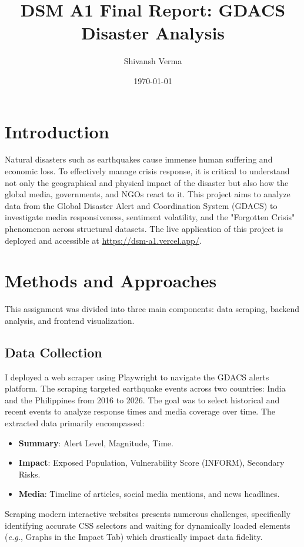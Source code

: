 \documentclass[11pt,a4paper]{article}
\title{\textbf{DSM A1 Final Report: GDACS Disaster Analysis}}
\author{Shivansh Verma}
\date{\today}
\begin{document}
\maketitle

\tableofcontents
\newpage

\section{Introduction}
Natural disasters such as earthquakes cause immense human suffering and economic loss. To effectively manage crisis response, it is critical to understand not only the geographical and physical impact of the disaster but also how the global media, governments, and NGOs react to it. This project aims to analyze data from the Global Disaster Alert and Coordination System (GDACS) to investigate media responsiveness, sentiment volatility, and the "Forgotten Crisis" phenomenon across structural datasets. The live application of this project is deployed and accessible at \url{https://dsm-a1.vercel.app/}.

\section{Methods and Approaches}
This assignment was divided into three main components: data scraping, backend analysis, and frontend visualization. 

\subsection{Data Collection}
I deployed a web scraper using Playwright to navigate the GDACS alerts platform. The scraping targeted earthquake events across two countries: India and the Philippines from 2016 to 2026. The goal was to select historical and recent events to analyze response times and media coverage over time. The extracted data primarily encompassed:
\begin{itemize}
    \item \textbf{Summary}: Alert Level, Magnitude, Time.
    \item \textbf{Impact}: Exposed Population, Vulnerability Score (INFORM), Secondary Risks.
    \item \textbf{Media}: Timeline of articles, social media mentions, and news headlines.
\end{itemize}
Scraping modern interactive websites presents numerous challenges, specifically identifying accurate CSS selectors and waiting for dynamically loaded elements (\textit{e.g.}, Graphs in the Impact Tab) which drastically impact data fidelity.
\end{document}
